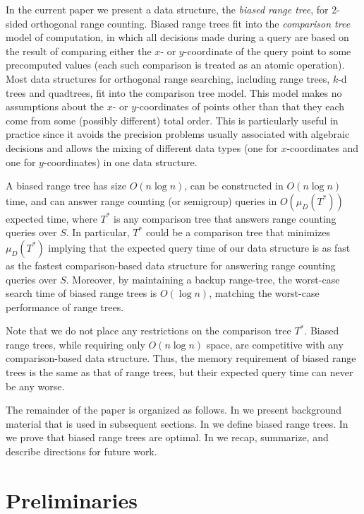 \documentclass{patmorin}
\begin{document}
In the current paper we present a data structure, the \emph{biased range
tree}, for 2-sided orthogonal range counting.  Biased range trees fit into
the \emph{comparison tree} model of computation, in which all decisions
made during a query are based on the result of comparing either the
$x$- or $y$-coordinate of the query point to some precomputed values
(each such comparison is treated as an atomic operation).  Most data
structures for orthogonal range searching, including range trees, $k$-d
trees and quadtrees, fit into the comparison tree model. This model
makes no assumptions about the $x$- or $y$-coordinates of points other
than that they each come from some (possibly different) total order.
This is particularly useful in practice since it avoids the precision
problems usually associated with algebraic decisions and allows the
mixing of different data types (one for $x$-coordinates and one for
$y$-coordinates) in one data structure.

A biased range tree has size $O(n\log n)$, can be constructed in
$O(n\log n)$ time, and can answer range counting (or semigroup) queries
in $O(\mu_D(T^*))$ expected time, where $T^*$ is any comparison tree
that answers range counting queries over $S$.  In particular, $T^*$
could be a comparison tree that minimizes $\mu_D(T^*)$ implying that
the expected query time of our data structure is as fast as the fastest
comparison-based data structure for answering range counting queries
over $S$.  Moreover, by maintaining a backup range-tree, the worst-case
search time of biased range trees is $O(\log n)$, matching the worst-case
performance of range trees.

Note that we do not place any restrictions on the comparison tree $T^*$.
Biased range trees, while requiring only $O(n\log n)$ space, are
competitive with any comparison-based data structure.  Thus, the memory
requirement of biased range trees is the same as that of range trees, but
their expected query time can never be any worse.
 
The remainder of the paper is organized as follows. In
 we present background material that is used in
subsequent sections.  In  we define biased
range trees. In  we prove that biased range trees
are optimal.  In  we recap, summarize, and describe
directions for future work.

\section{Preliminaries}
\end{document}
